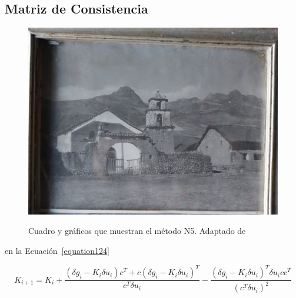 \subsection{Matriz de Consistencia}

\lipsum[17]

\lipsum[18]

\begin{figure}[!ht]
  \caption[Cuadro y gráficos que muestran el método N5]{Cuadro y gráficos que muestran el método N5. Adaptado de \cite{deWaal2009}}
  \includegraphics[scale=0.36]{F_Figures/15_Chapter VI/Cap6_Imagen1.jpeg}
	\label{Cap3_Figura3}
\end{figure}

\lipsum[22] en la Ecuación~\ref{equation124}


\begin{equation}\label{equation124}
  K_{i+1}=K_{i}+\frac{\left ( \delta g_{i}-K_{i}\delta u_{i} \right )c^{T}+c\left ( \delta g_{i}-K_{i}\delta u_{i} \right )^{T}}{c^{T}\delta u_i}-\frac{\left ( \delta g_{i}-K_{i}\delta u_{i} \right )^{T}\delta u_{i} c c^{T}}{\left ( c^{T}\delta u_{i} \right )^{2}}
\end{equation}
